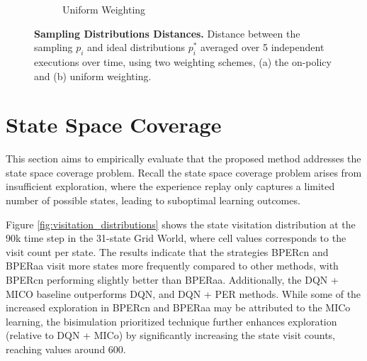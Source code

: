 \begin{figure}[!h]
\begin{subfigure}{0.45\textwidth}
        \caption{Uniform Weighting}
        \label{fig:priority_dist_distance_uniform_weighting}
    \end{subfigure}
    \caption[Sampling Distributions Distances]{\textbf{Sampling Distributions Distances.} Distance between the sampling $p_i$ and ideal distributions $p^\ast_i$  averaged over 5 independent executions over time, using two weighting schemes, (a) the on-policy and (b) uniform weighting.}
    \label{fig:priority_dist_distance}
\end{figure}

\section{State Space Coverage}

This section aims to empirically evaluate that the proposed method addresses the state space coverage problem. Recall the state space coverage problem arises from insufficient exploration, where the experience replay only captures a limited number of possible states, leading to suboptimal learning outcomes.

Figure \ref{fig:visitation_distributions} shows the state visitation distribution at the 90k time step in the 31-state Grid World, where cell values corresponds to the visit count per state. The results indicate that the strategies BPERcn and BPERaa visit more states more frequently compared to other methods, with BPERcn performing slightly better than BPERaa. Additionally, the DQN + MICO baseline outperforms DQN, and DQN + PER methods. While some of the increased exploration in BPERcn and BPERaa may be attributed to the MICo learning, the bisimulation prioritized technique further enhances exploration (relative to DQN + MICo) by significantly increasing the state visit counts, reaching values around 600.

